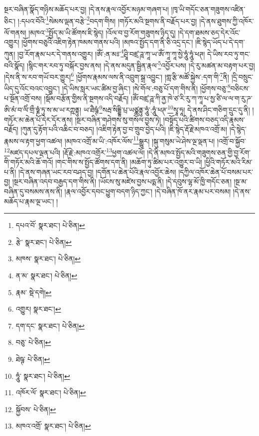 སྔར་བཞིན་སྣོད་གཉིས་མཆོད་པར་བྱ། །དེ་ནས་རྣལ་འབྱོར་མཉམ་གཞག་པ། །ཁྭ་ཡི་གདོང་ཅན་གཟུགས་འཛིན་ཅིང་། །:དཔའ་བོའི་\footnote{དཔའ་བོ་  སྣར་ཐང་།  པེ་ཅིན། }སེམས་ལྡན་བརྩེ་\footnote{རྩེ་  སྣར་ཐང་།  པེ་ཅིན། }བདག་གིས། །གཏོར་མའི་སྔགས་ནི་བརྗོད་པར་བྱ། །དེ་ནས་ཐུགས་ཀྱི་འཁོར་ལོ་གནས། །མཁའ་\footnote{མཁས་  སྣར་ཐང་།  པེ་ཅིན། }སྤྱོད་མ་ཡི་ཚོགས་ཇི་སྙེད། །འོལ་བ་བྱ་རོག་གཟུགས་ཉིད་དུ། །དེ་དག་ཐམས་ཅད་དེར་འོང་འགྱུར། །ཕྱོགས་བཅུའི་འཇིག་རྟེན་ཁམས་གནས་པའི། །མཁའ་སྤྱོད་དག་ནི་ཅི་འདྲ་དང་། །ཇི་སྙེད་ཡོད་པ་དེ་དག་ཀུན། །བྱ་རོག་རྣམ་པར་དེ་གནས་འགྱུར། །ཨོཾ་:ན་མཿ་\footnote{ན་མ་  སྣར་ཐང་།  པེ་ཅིན། }ཤྲཱི་བཛྲ་ཌཱ་ཀཱ་ཡ་ཨོཾ་ཀཱ་ཀཱ་སྱེ་ཧཱུཾ་ཧཱུཾ་ཕཊ། དེ་ཡིས་རབ་ཏུ་གང་བའི་སྣོད། །སྙིང་གར་རབ་ཏུ་བསྐོར་བྱས་ནས། །དེ་ནས་མདུན་སྦྱིན་རྣལ་\footnote{རྣམ་  སྡེ་དགེ། }འབྱོར་པས། །དེ་རུ་མཚན་མ་བརྟག་པར་བྱ། །དེས་ནི་ས་རབ་གཡོ་བར་གྱུར།\footnote{འགྱུར།  སྣར་ཐང་། } །ཕྱོགས་རྣམས་ལས་ནི་འབྲུག་སྒྲ་འབྱུང་། །གླ་རྩི་མཚོ་སྐྱེས་:དག་གི་\footnote{དག་དང་  སྣར་ཐང་།  པེ་ཅིན། }ནི། །དྲི་བསྲུང་ཡིད་དུ་འོང་བའང་འབྱུང་། །དེ་ཡིས་སླར་ཡང་ཚིམ་བྱ་ཞིང་། །སེ་གོལ་:བཅུ་པོ་དག་གིས་ནི། །ཕྱོགས་བཅུ་\footnote{བཅུ་  པེ་ཅིན། }བཅིངས་པ་སྔོན་འགྲོ་བས། །སྡོམ་བརྩོན་གྱིས་ནི་སྔགས་འདི་བརྗོད། །ཨོཾ་བཛྲ་ཌཱ་ཀི་ནྱ་ཁེ་ཙ་རི་རུ་ཀ་ཀཱ་པ་སྱ་ཙི་ལ་ལ་ག་རུ་ཌ་ཨི་མཾ་བ་ལིཾ་གྲྀ་ཧྞཾ་ཏུ་ས་མ་ཡ་རཀྵནྟུ། ཡ་ཐཻཥྚཾ་\footnote{ཐེཥྚ་  པེ་ཅིན། }སརྦ་སིདྡྷི་པྲ་ཡཙྪནྟུ་ཧཱུཾ་:ཧཱུཾ་ཕཊ་\footnote{ཧཱུཾ་  སྣར་ཐང་།  པེ་ཅིན། }སྭཱ་ཧཱ། དེ་ནས་ཤིང་གཅིག་དྲུང་དུ་ནི། །གཏོར་མ་ཆེན་པོ་དེར་དོར་ནས། །སྔར་བཞིན་གཤེགས་སུ་གསོལ་བྱས་ཏེ། །བསྟོད་པའི་ཚིགས་བཅད་འདི་རྣམས་བརྗོད། །ཀུན་དུ་རྟོག་པའི་འཆིང་བ་བཅད། །འཇིག་རྟེན་བྱ་བ་གྲུབ་བྱེད་པའི། །ཇི་སྙེད་རྡོ་རྗེ་མཁའ་འགྲོ་མ། །དེ་སྙེད་རྣམས་ལ་རྟག་ཕྱག་འཚལ། །མཁའ་འགྲོ་མ་ཡི་:འཁོར་ལོས་\footnote{འཁོར་ལོ་  སྣར་ཐང་།  པེ་ཅིན། }སྒྱུར། །སྐུ་གསུམ་ཡེ་ཤེས་ལྔ་ལྡན་པ། །འགྲོ་བ་སྐྱོབ་\footnote{སྐྱོབས་  པེ་ཅིན། }མཛད་དཔལ་ལྡན་པའི། །རྡོ་རྗེ་:མཁའ་འགྲོར་\footnote{མཁའ་འགྲོ་  སྣར་ཐང་།  པེ་ཅིན། }ཕྱག་འཚལ་ལོ། །དེ་ནི་མཁའ་སྤྱོད་མའི་གཟུགས་ཅན་གྱི་བྱ་རོག་གི་གཏོར་མའི་ཆོ་གའོ། །གང་གིས་ས་སྤྱོད་ཚོགས་དག་ནི། །མཆོག་ཏུ་ཚིམ་པར་འགྱུར་བ་ཡི། །ཕྱིའི་གཏོར་མའི་རིམ་པ་ནི། །དེ་ནས་གཞན་ཡང་རབ་བཤད་བྱ། །དགོན་པ་ཆེན་པོའི་རྣལ་འབྱོར་ཆེས། །དཀྱིལ་འཁོར་ཆེན་པོ་བསམ་པར་བྱ། །སྔར་བཞིན་འདབ་བརྒྱད་དག་གིས་ནི། །ཡོངས་སུ་མཛེས་བྱས་པདྨ་ནི། །དེ་དབུས་ལྷ་མོ་ཁྱི་གདོང་ཅན། །སྔ་མ་བཞིན་དུ་བསམས་ནས་ནི། །རྣལ་འབྱོར་དབང་ཕྱུག་བདག་ཉིད་ཀྱང་། །དེ་བཞིན་ཁོ་ནར་རྣམ་པར་བསམ། །དེ་ནས་མཆོད་པ་རྣམ་ལྔ་ཡང་། །
